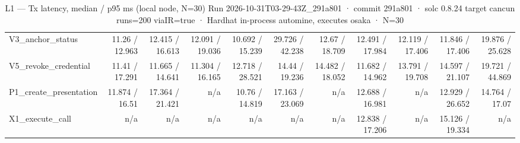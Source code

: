 \begin{table}[ht]
\begin{tabular}{lrrrrrrrrrr}
V3\_anchor\_status & 11.26 / 12.963 & 12.415 / 16.613 & 12.091 / 19.036 & 10.692 / 15.239 & 29.726 / 42.238 & 12.67 / 18.709 & 12.491 / 17.984 & 12.119 / 17.406 & 11.846 / 17.406 & 19.876 / 25.628 \\
V5\_revoke\_credential & 11.41 / 17.291 & 11.665 / 14.641 & 11.304 / 16.165 & 12.718 / 28.521 & 14.44 / 19.236 & 14.482 / 18.052 & 11.682 / 14.962 & 13.791 / 19.708 & 14.597 / 21.107 & 19.721 / 44.869 \\
P1\_create\_presentation & 11.874 / 16.51 & 17.364 / 21.421 & n/a & 10.76 / 14.819 & 17.163 / 23.069 & n/a & 12.688 / 16.981 & n/a & 12.929 / 26.652 & 14.764 / 17.07 \\
X1\_execute\_call & n/a & n/a & n/a & n/a & n/a & n/a & 12.838 / 17.206 & n/a & 15.126 / 19.334 & n/a \\
\bottomrule
\end{tabular}
\caption{L1 — Tx latency, median / p95 ms (local node, N=30) Run 2026-10-31T03-29-43Z\_291a801 · commit 291a801 · solc 0.8.24 target cancun runs=200 viaIR=true · Hardhat in-process automine, executes osaka · N=30}
\label{tab:crud_latency_tx}
\end{table}
